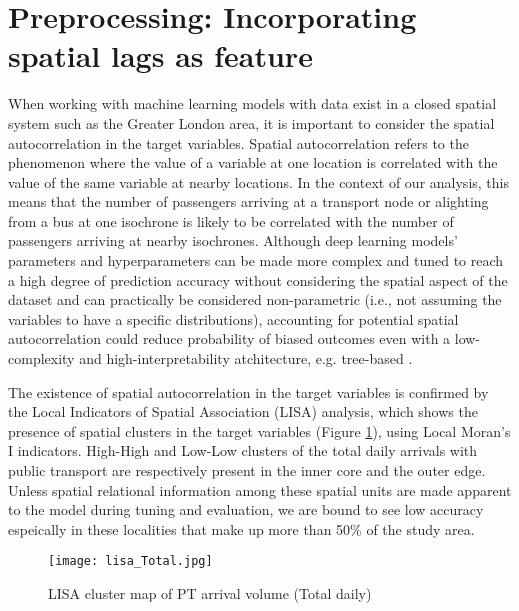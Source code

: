 \section{Preprocessing: Incorporating spatial lags as feature}

When working with machine learning models with data exist in a closed spatial system such as the Greater London area, it is important to consider the spatial autocorrelation in the target variables. Spatial autocorrelation refers to the phenomenon where the value of a variable at one location is correlated with the value of the same variable at nearby locations. In the context of our analysis, this means that the number of passengers arriving at a transport node or alighting from a bus at one isochrone is likely to be correlated with the number of passengers arriving at nearby isochrones. Although deep learning models' parameters and hyperparameters can be made more complex and tuned to reach a high degree of prediction accuracy without considering the spatial aspect of the dataset and can practically be considered non-parametric (i.e., not assuming the variables to have a specific distributions), accounting for potential spatial autocorrelation could reduce probability of biased outcomes even with a low-complexity and high-interpretability atchitecture, e.g. tree-based \citep{meyerImportanceSpatialPredictor2019}.

The existence of spatial autocorrelation in the target variables is confirmed by the Local Indicators of Spatial Association (LISA) analysis, which shows the presence of spatial clusters in the target variables (Figure \ref{fig:lisacluster}), using Local Moran's I indicators. High-High and Low-Low clusters of the total daily arrivals with public transport are respectively present in the inner core and the outer edge. Unless spatial relational information among these spatial units are made apparent to the model during tuning and evaluation, we are bound to see low accuracy espeically in these localities that make up more than 50\% of the study area.  

\begin{figure}[ht]
    \centering
    \texttt{[image: lisa\_Total.jpg]}
    \captionsetup{justification=centering}
    \caption{LISA cluster map of PT arrival volume (Total daily)}
    \label{fig:lisacluster}
\end{figure}


